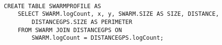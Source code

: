 \begin{lstlisting}[label={code:SWARMPROFILE}]  % Start your code-block

CREATE TABLE SWARMPROFILE AS 
	SELECT SWARM.logCount, x, y, SWARM.SIZE AS SIZE, DISTANCE, 
		DISTANCEGPS.SIZE AS PERIMETER 
	FROM SWARM JOIN DISTANCEGPS ON 
		SWARM.logCount = DISTANCEGPS.logCount;
\end{lstlisting}
